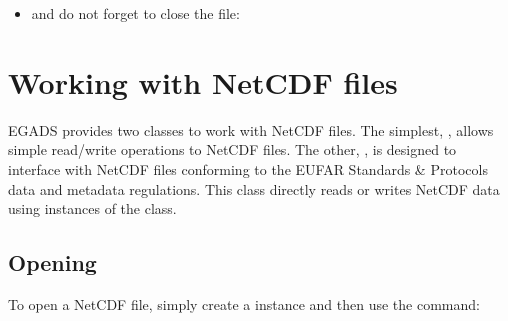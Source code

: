\documentclass[a4paper,10pt,openany,english]{sphinxmanual}
\begin{document}
\begin{itemize}
\begin{sphinxVerbatim}[commandchars=\\\{\}]
\end{sphinxVerbatim}

\item {} 
and do not forget to close the file:

\begin{sphinxVerbatim}[commandchars=\\\{\}]
\end{sphinxVerbatim}

\end{itemize}
\newpage\newpage

\section{Working with NetCDF files}
\label{tutorial:working-with-netcdf-files}
EGADS provides two classes to work with NetCDF files. The simplest, , allows simple read/write operations to NetCDF files. The other, , is designed to interface with NetCDF files conforming to the EUFAR Standards \& Protocols data and metadata regulations. This class directly reads or writes NetCDF data using instances of the {\hyperref[egadsapi:egads.core.egads_core.EgadsData]{}} class.


\subsection{Opening}
\label{tutorial:id8}
To open a NetCDF file, simply create a {\hyperref[egadsapi:egads.input.netcdf_io.NetCdf]{}} instance and then use the  command:

\begin{sphinxVerbatim}[commandchars=\\\{\}]
 
  
\end{sphinxVerbatim}
\end{document}
